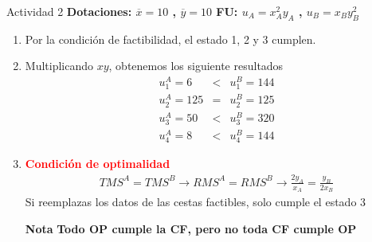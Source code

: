 \begin{frame}{Actividad 2}
	\textbf{Dotaciones: $\overline{x}=10$ , $\overline{y}=10$ \qquad FU: $u_{A}=x_{A}^{2}y_{A}$ , $u_{B}=x_{B}y_{B}^{2}$}
	\begin{enumerate}
		\item Por la condición de factibilidad, el estado 1, 2 y 3 cumplen.
		\item Multiplicando $xy$, obtenemos los siguiente resultados
				$$\begin{array}{ccc}
					u_{1}^{A} = 6   & < & u_{1}^{B}=144\\
					u_{2}^{A} = 125 & = & u_{2}^{B}=125\\
					u_{3}^{A} = 50  & < & u_{3}^{B}=320\\
					u_{4}^{A} = 8   & < & u_{4}^{B}=144
				\end{array}$$
		\item \textcolor{red}{\textbf{Condición de optimalidad}}
				\begin{gather*}
						TMS^{A} = TMS^{B} \rightarrow RMS^{A} = RMS^{B} \rightarrow \frac{2y_{A}}{x_{A}} = \frac{y_{B}}{2x_{B}}
				\end{gather*}
			  Si reemplazas los datos de las cestas factibles, solo cumple el estado 3
				  \begin{alertblock}{\textbf{Nota}}
				  	\textbf{Todo OP cumple la CF, pero no toda CF cumple OP}
				  \end{alertblock}
	\end{enumerate}
\end{frame}
